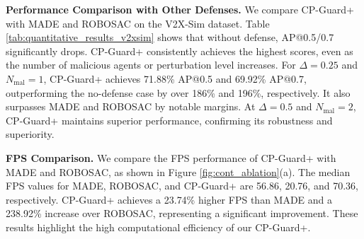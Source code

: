 \begin{table}[t]
    \vspace{-2mm}
    \caption{\textbf{Generalization results of CP-Guard+.} Test perturbation budgets $\Delta=0.25$.
    }
    \vspace{1mm}
    \label{tab:generalization_results}
    \centering 
    \renewcommand\arraystretch{1}
    \vspace{-8mm}
\end{table}



\textbf{Performance Comparison with Other Defenses.} We compare CP-Guard+ with MADE \citep{zhaoMaliciousAgentDetection2024} and ROBOSAC \citep{liUsAdversariallyRobust2023} on the V2X-Sim dataset. Table \ref{tab:quantitative_results_v2xsim} shows that without defense, AP@0.5/0.7 significantly drops. CP-Guard+ consistently achieves the highest scores, even as the number of malicious agents or perturbation level increases. For $\Delta=0.25$ and $N_\text{mal}=1$, CP-Guard+ achieves 71.88\% AP@0.5 and 69.92\% AP@0.7, outperforming the no-defense case by over 186\% and 196\%, respectively. It also surpasses MADE and ROBOSAC by notable margins. At $\Delta=0.5$ and $N_\text{mal}=2$, CP-Guard+ maintains superior performance, confirming its robustness and superiority.






\textbf{FPS Comparison.} We compare the FPS performance of CP-Guard+ with MADE and ROBOSAC, as shown in Figure \ref{fig:cont_ablation}(a). The median FPS values for MADE, ROBOSAC, and CP-Guard+ are 56.86, 20.76, and 70.36, respectively. CP-Guard+ achieves a 23.74\% higher FPS than MADE and a 238.92\% increase over ROBOSAC, representing a significant improvement. These results highlight the high computational efficiency of our CP-Guard+.

